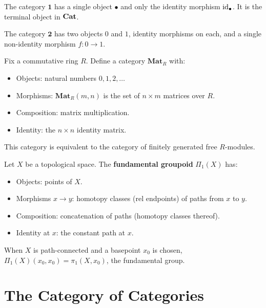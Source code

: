 \begin{example}
The category $\mathbf{1}$ has a single object $\bullet$ and only the identity morphism $\mathrm{id}_\bullet$. It is the terminal object in $\mathbf{Cat}$.
\end{example}

\begin{example}
The category $\mathbf{2}$ has two objects $0$ and $1$, identity morphisms on each, and a single non-identity morphism $f: 0 \to 1$.
\end{example}

\begin{example}
Fix a commutative ring $R$. Define a category $\mathbf{Mat}_R$ with:
\begin{itemize}
  \item Objects: natural numbers $0, 1, 2, \ldots$
  \item Morphisms: $\mathbf{Mat}_R(m, n)$ is the set of $n \times m$ matrices over $R$.
  \item Composition: matrix multiplication.
  \item Identity: the $n \times n$ identity matrix.
\end{itemize}
This category is equivalent to the category of finitely generated free $R$-modules.
\end{example}

\begin{example}
Let $X$ be a topological space. The \textbf{fundamental groupoid} $\Pi_1(X)$ has:
\begin{itemize}
  \item Objects: points of $X$.
  \item Morphisms $x \to y$: homotopy classes (rel endpoints) of paths from $x$ to $y$.
  \item Composition: concatenation of paths (homotopy classes thereof).
  \item Identity at $x$: the constant path at $x$.
\end{itemize}
When $X$ is path-connected and a basepoint $x_0$ is chosen, $\Pi_1(X)(x_0, x_0) = \pi_1(X, x_0)$, the fundamental group.
\end{example}

\section{The Category of Categories}


